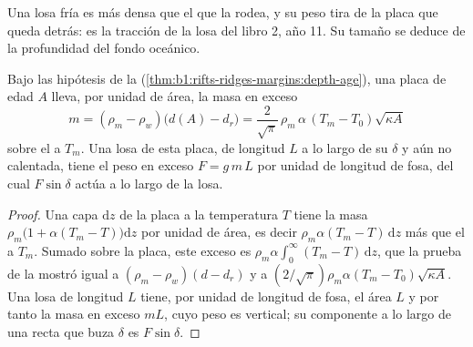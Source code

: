 Una losa fría es más densa que el  que la rodea, y su peso tira de la placa que queda detrás: es la tracción de la losa del libro 2,
año 11. Su tamaño se deduce de la profundidad del fondo oceánico.

\begin{proposition}\label{prop:b1:active-margins:slab-weight}
Bajo las hipótesis de la  (\cref{thm:b1:rifts-ridges-margins:depth-age}), una placa de edad $A$ lleva, por unidad de área, la
masa en exceso
\[
  m = (\rho_m - \rho_w)\bigl(d(A) - d_r\bigr)
    = \frac{2}{\sqrt\pi}\,\rho_m\,\alpha\,(T_m - T_0)\sqrt{\kappa A}
\]
sobre el  a $T_m$. Una losa de esta placa, de longitud $L$ a lo largo de su  $\delta$ y aún no calentada, tiene el peso en exceso
$F = g\,m\,L$ por unidad de longitud de fosa, del cual $F\sin\delta$ actúa a lo largo de la losa.
\end{proposition}

\begin{proof}
Una capa $\mathrm dz$ de la placa a la temperatura $T$ tiene la masa $\rho_m\bigl(1 + \alpha(T_m - T)\bigr)\mathrm dz$ por unidad de área, es decir
$\rho_m\alpha(T_m - T)\,\mathrm dz$ más que el  a $T_m$. Sumado sobre la placa, este exceso es $\rho_m\alpha\int_0^\infty (T_m - T)\,\mathrm dz$,
que la prueba de la  mostró igual a $(\rho_m - \rho_w)(d - d_r)$ y a $(2/\sqrt\pi)\rho_m\alpha(T_m - T_0)
\sqrt{\kappa A}$. Una losa de longitud $L$ tiene, por unidad de longitud de fosa, el área $L$ y por tanto la masa en exceso $mL$, cuyo peso es
vertical; su componente a lo largo de una recta que buza $\delta$ es $F\sin\delta$.
\end{proof}

